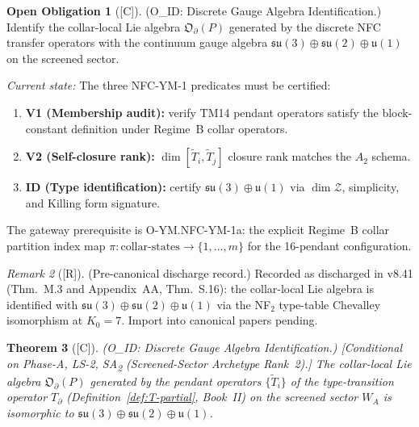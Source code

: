 \documentclass[12pt,oneside]{amsbook}
\theoremstyle{plain}
\newtheorem{theorem}{Theorem}[section]
\theoremstyle{definition}
\newtheorem{obligation}[theorem]{Open Obligation}
\theoremstyle{remark}
\newtheorem{remark}[theorem]{Remark}
\newcommand{\status}[1]{\textup{[#1]}}
\begin{document}
\bigskip

\begin{obligation}[\status{C}]\label{ob:O-ID}
\textup{(O\_ID: Discrete Gauge Algebra Identification.)}
Identify the collar-local Lie algebra $\mathfrak{O}_\partial(P)$
generated by the discrete NFC transfer operators with the
continuum gauge algebra $\mathfrak{su}(3)\oplus\mathfrak{su}(2)
\oplus\mathfrak{u}(1)$ on the screened sector.

\emph{Current state:} The three NFC-YM-1 predicates must be
certified:
\begin{enumerate}[label=\textup{(V\arabic*)}]
 \item \textbf{V1 (Membership audit):} verify TM14 pendant operators
 satisfy the block-constant definition under Regime~B collar
 operators.
 \item \textbf{V2 (Self-closure rank):} $\dim[\tilde{T}_i,\tilde{T}_j]$
 closure rank matches the $A_2$ schema.
 \item \textbf{ID (Type identification):} certify
 $\mathfrak{su}(3)\oplus\mathfrak{u}(1)$ via $\dim\mathcal{Z}$,
 simplicity, and Killing form signature.
\end{enumerate}
The gateway prerequisite is O-YM.NFC-YM-1a: the explicit
Regime~B collar partition index map $\pi: \mathrm{collar\text{-}states}
\to \{1,\ldots,m\}$ for the 16-pendant configuration.
\end{obligation}
\begin{remark}[\status{R}]
\textup{(Pre-canonical discharge record.)} Recorded as discharged in v8.41 (Thm.~M.3 and Appendix~AA,
Thm.~S.16): the collar-local Lie algebra is identified with
$\mathfrak{su}(3)\oplus\mathfrak{su}(2)\oplus\mathfrak{u}(1)$
via the NF$_2$ type-table Chevalley isomorphism at $K_0=7$.
Import into canonical papers pending.
\end{remark}

\begin{theorem}[\status{C}]\label{thm:O-ID}
\textup{(O\_ID: Discrete Gauge Algebra Identification.)}
\textup{[Conditional on Phase-A, LS-2, SA\textsubscript{2}
(Screened-Sector Archetype Rank~2).]}\;
The collar-local Lie algebra $\mathfrak{O}_\partial(P)$ generated
by the pendant operators $\{\tilde{T}_i\}$ of the type-transition
operator $T_\partial$ (Definition~\ref{def:T-partial}, Book~II)
on the screened sector $W_A$ is isomorphic to
$\mathfrak{su}(3) \oplus \mathfrak{su}(2) \oplus \mathfrak{u}(1)$.
\end{theorem}
\end{document}

